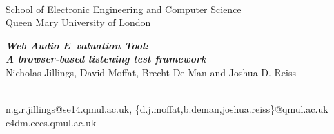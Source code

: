 
\begin{center}
\colorbox{qmuldarkblue}
{
 \color{white}

 \parbox{1.0\textwidth}
 {
  \parbox{0.2\textwidth}
  {
   \begin{center}
   \\[1ex]
   \textrm
   {
    \footnotesize
    School of Electronic Engineering and Computer Science\\
    Queen Mary University of London\\
   }
   \end{center}
  }
  \parbox{0.58\textwidth}
  {
   \vspace{1cm}
   \begin{center}
   \textrm
   {
    {\veryHuge \bf \em Web Audio E valuation Tool:\\ A browser-based listening test framework}\\[1ex]
    {\Large       Nicholas Jillings, David Moffat, Brecht De Man and Joshua D. Reiss}
   }    
   \end{center}
   \vspace{1cm}
  }
  \parbox{0.2\textwidth}
  {
   \begin{center}
   \\[1ex]
   \textrm
   {
    \small
    n.g.r.jillings@se14.qmul.ac.uk, \{d.j.moffat,b.deman,joshua.reiss\}@qmul.ac.uk\\
    c4dm.eecs.qmul.ac.uk\\
   }
   \end{center}
  }
 }
}
\end{center}
